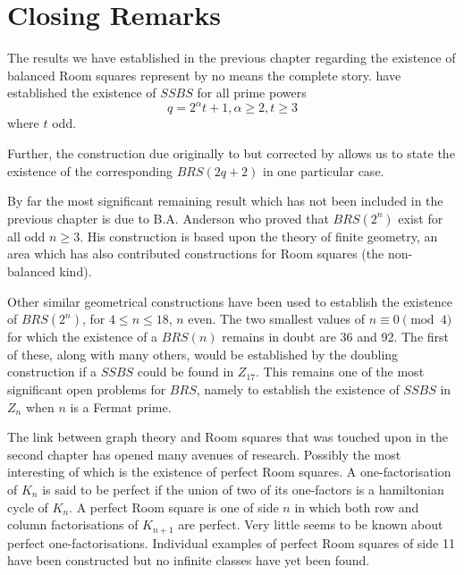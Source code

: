 \chapter{Closing Remarks}
\label{ch:closing-remarks}

The results we have established in the previous chapter regarding the existence of balanced Room squares represent by no means the complete story.
\cite{duExistenceSymmetricSkew1988} have established the existence of $SSBS$ for all prime powers
\begin{equation}
q = 2^{\alpha}t + 1, \alpha \geq 2, t \geq 3
\end{equation}
where $t$ odd.

Further, the construction due originally to
\cite{hwangCompleteBalancedHowell1984}
but corrected by
\cite{andersonConstructionBalancedRoom1999}
allows us to state the existence of the corresponding $BRS(2q + 2)$ in one particular case.

By far the most significant remaining result which has not been included in the previous chapter is due to B.A. Anderson who proved that $BRS(2^n)$ exist for all odd $n \geq 3$.
His construction is based upon the theory of finite geometry, an area which has also contributed constructions for Room squares (the non-balanced kind).

Other similar geometrical constructions have been used to establish the existence of $BRS(2^n)$, for $4 \leq n \leq 18$, $n$ even.
The two smallest values of $n \equiv 0 \pmod 4$ for which the existence of a $BRS(n)$ remains in doubt are 36 and 92.
The first of these, along with many others, would be established by the doubling construction if a $SSBS$ could be found in $Z_{17}$.
This remains one of the most significant open problems for $BRS$, namely to establish the existence of $SSBS$ in $Z_n$ when $n$ is a Fermat prime.

The link between graph theory and Room squares that was touched upon in the second chapter has opened many avenues of research.
Possibly the most interesting of which is the existence of perfect Room squares.
A one-factorisation of $K_n$ is said to be perfect if the union of two of its one-factors is a hamiltonian cycle of $K_n$.
A perfect Room square is one of side $n$ in which both row and column factorisations of $K_{n + 1}$ are perfect.
Very little seems to be known about perfect one-factorisations.
Individual examples of perfect Room squares of side 11 have been constructed but no infinite classes have yet been found.
